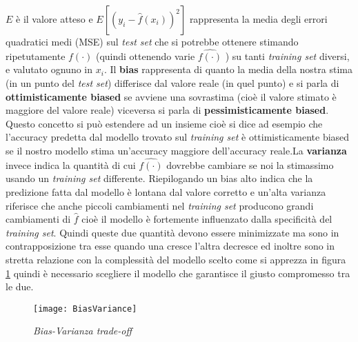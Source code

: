 $E$ è il valore atteso e $E[( y_i − \hat{f}(x_i) )^2]$  rappresenta la media degli errori quadratici medi (MSE) sul \textit{test set}  che si potrebbe ottenere stimando ripetutamente $f(\cdot)$ (quindi ottenendo varie $\hat{f(\cdot)}$ ) su tanti \textit{training set} diversi, e valutato ognuno in $x_i$. Il \textbf{bias} rappresenta di quanto la media della nostra stima (in un punto del \textit{test set}) differisce dal valore reale (in quel punto) e si parla di \textbf{ottimisticamente biased} se avviene una sovrastima (cioè il valore stimato è maggiore del valore reale) viceversa si parla di  \textbf{pessimisticamente biased}.  Questo concetto si può estendere ad un insieme cioè si dice ad esempio che l'accuracy predetta dal modello trovato sul \textit{training set} è ottimisticamente biased se il nostro modello stima un'accuracy maggiore dell'accuracy reale.La \textbf{varianza} invece indica la quantità di cui $\hat{f(\cdot)}$ dovrebbe cambiare se noi la stimassimo usando un \textit{training set} differente. Riepilogando un bias alto indica che la predizione fatta dal modello è lontana dal valore corretto e un'alta varianza riferisce che anche piccoli cambiamenti nel \textit{training set} producono grandi cambiamenti di $\hat{f}$ cioè il modello è fortemente influenzato dalla specificità del \textit{training set}. Quindi queste due quantità devono essere minimizzate ma sono in contrapposizione tra esse quando una cresce l'altra decresce ed inoltre sono in stretta relazione con la complessità del modello scelto come si apprezza in figura \ref{fig:bvtrd} quindi è necessario scegliere il modello che garantisce il  giusto compromesso tra le due.

\begin{figure}[htp]
	\centering
	\texttt{[image: BiasVariance]}
	\caption[Bias-Varianza trade-off]{\textit{Bias-Varianza trade-off}}
   \label{fig:bvtrd}
\end{figure}

